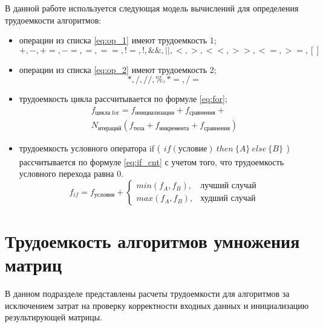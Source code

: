 \documentclass[a4paper,oneside,14pt]{extreport}
\begin{document}
В данной работе используется следующая модель вычислений для определения трудоемкости алгоритмов:
\begin{itemize}
	\item операции из списка \ref{eq:op_1} имеют трудоемкость 1;
	\begin{equation} \label{eq:op_1}
	+, -, +=, -=, =, ==, !=, !, \&\&, ||, <, >, <<, >>, <=, >=, [] 
	\end{equation}
	\item операции из списка \ref{eq:op_2} имеют трудоемкость 2;
	\begin{equation} \label{eq:op_2}
	*, /, //, \%, *=, /=
	\end{equation}
	\item трудоемкость цикла рассчитывается по формуле \ref{eq:for};
	\begin{equation} \label{eq:for}
	\begin{array}{ll}
		f_{\text{цикла for}} = f_{\text{инициализации}} + f_{\text{сравнения}} +\\
		N_{\text{итераций}} (f_{\text{тела}} + f_{\text{инкремента}} + f_{\text{сравнения}})
	\end{array}
	\end{equation}
	\item трудоемкость условного оператора if ($
	\begin{array}{ll}
	if (\text{условие}) \ then \ \{A\}\ else \	 \{B\}  
	\end{array}
	$) рассчитывается по формуле \ref{eq:if_cnt} с учетом того, что трудоемкость условного перехода равна 0. \\
	\begin{equation} \label{eq:if_cnt}
	f_{if} = f_{\text{условия}} +
	\begin{cases}
	min(f_A, f_B), & \textrm{лучший случай}\\
	max(f_A, f_B), & \textrm{худший случай}
	\end{cases}
	\end{equation}
\end{itemize}

\section{Трудоемкость алгоритмов умножения матриц}
В данном подразделе представлены расчеты трудоемкости для алгоритмов за исключением затрат на проверку корректности входных данных и инициализацию результирующей матрицы.
\end{document}
